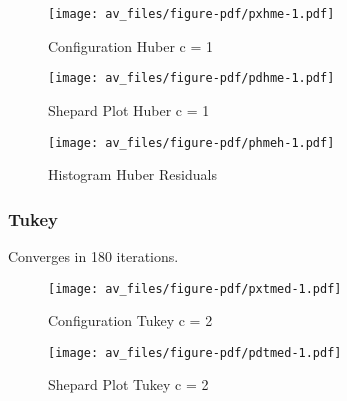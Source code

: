 \documentclass[
  12pt,
  letterpaper,
  DIV=11,
  numbers=noendperiod]{scrartcl}
\newenvironment{Shaded}{\begin{snugshade}}{\end{snugshade}}
\newcommand{\AttributeTok}[1]{\textcolor[rgb]{0.40,0.45,0.13}{#1}}
\newcommand{\FunctionTok}[1]{\textcolor[rgb]{0.28,0.35,0.67}{#1}}
\newcommand{\NormalTok}[1]{\textcolor[rgb]{0.00,0.23,0.31}{#1}}
\newcommand{\SpecialCharTok}[1]{\textcolor[rgb]{0.37,0.37,0.37}{#1}}
\newcommand{\StringTok}[1]{\textcolor[rgb]{0.13,0.47,0.30}{#1}}
\theoremstyle{plain}
\theoremstyle{remark}
\begin{document}
\begin{figure}[H]

{\centering \texttt{[image: av\_files/figure-pdf/pxhme-1.pdf]}

}

\caption{Configuration Huber c = 1}

\end{figure}%

\begin{figure}[H]

{\centering \texttt{[image: av\_files/figure-pdf/pdhme-1.pdf]}

}

\caption{Shepard Plot Huber c = 1}

\end{figure}%

\begin{figure}[H]

{\centering \texttt{[image: av\_files/figure-pdf/phmeh-1.pdf]}

}

\caption{Histogram Huber Residuals}

\end{figure}%

\subsubsection{Tukey}\label{tukey-1}

Converges in 180 iterations.

\begin{figure}[H]

{\centering \texttt{[image: av\_files/figure-pdf/pxtmed-1.pdf]}

}

\caption{Configuration Tukey c = 2}

\end{figure}%

\begin{figure}[H]

{\centering \texttt{[image: av\_files/figure-pdf/pdtmed-1.pdf]}

}

\caption{Shepard Plot Tukey c = 2}

\end{figure}%

\begin{Shaded}
\end{Shaded}
\end{document}
